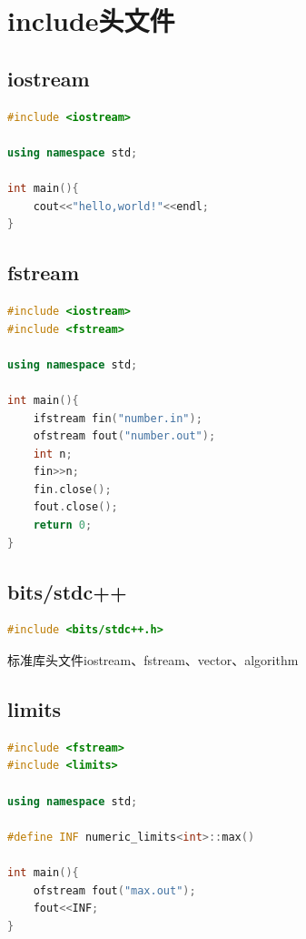 \documentclass[12pt,twiside,a4paper]{ctexbook}
\numberwithin{chapter}{part}
\begin{document}

\chapter{include头文件}
\section{iostream}
\begin{lstlisting}[language=C++]
#include <iostream>

using namespace std;

int main(){
	cout<<"hello,world!"<<endl;
}
\end{lstlisting}

\section{fstream}
\begin{lstlisting}[language=C++]
#include <iostream>
#include <fstream>

using namespace std;

int main(){
	ifstream fin("number.in");
	ofstream fout("number.out");
	int n;
	fin>>n;
	fin.close();
	fout.close();
	return 0;
}
\end{lstlisting}

\section{bits/stdc++}
\begin{lstlisting}[language=C++]
#include <bits/stdc++.h>
\end{lstlisting}
标准库头文件iostream、fstream、vector、algorithm
\section{limits}
\begin{lstlisting}[language=C++]
#include <fstream>
#include <limits>

using namespace std;

#define INF numeric_limits<int>::max()

int main(){
	ofstream fout("max.out");
	fout<<INF;
}
\end{lstlisting}
\end{document}
